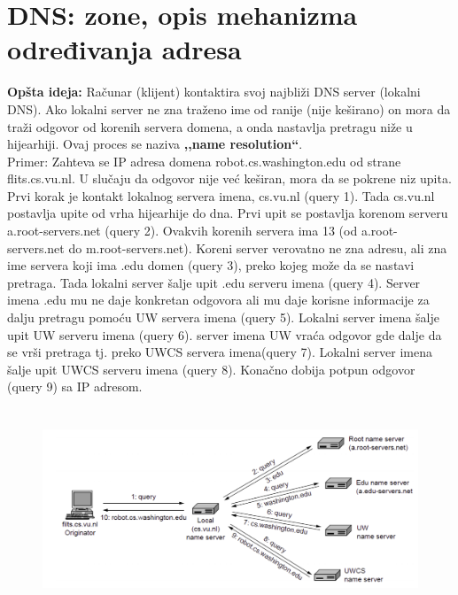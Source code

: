 \documentclass[a4paper]{article}
\begin{document}
\section{DNS: zone, opis mehanizma određivanja adresa}
    \textbf{Opšta ideja:} Računar (klijent) kontaktira svoj najbliži DNS server (lokalni DNS).
    Ako lokalni server ne zna traženo ime od ranije (nije keširano) on mora da traži odgovor od korenih
    servera domena, a onda nastavlja pretragu niže u hijearhiji. Ovaj proces se naziva 
    \textbf{,,name resolution``}.\\
    \indent Primer: Zahteva se IP adresa domena robot.cs.washington.edu od strane flits.cs.vu.nl.
    U slučaju da odgovor nije već keširan, mora da se pokrene niz upita. Prvi korak je kontakt
    lokalnog servera imena, cs.vu.nl (query 1). Tada cs.vu.nl postavlja upite od vrha hijearhije do dna. 
    Prvi upit se postavlja korenom serveru a.root-servers.net (query 2). Ovakvih korenih servera
    ima 13 (od a.root-servers.net do m.root-servers.net). 
    Koreni server verovatno ne zna adresu, ali zna ime servera koji ima .edu domen (query 3),
    preko kojeg može da se nastavi pretraga. Tada lokalni server šalje upit .edu serveru imena (query 4).
    Server imena .edu mu ne daje konkretan odgovora ali mu daje korisne informacije za dalju
    pretragu pomoću UW servera imena (query 5). Lokalni server imena šalje upit UW serveru imena (query 6).
    server imena UW vraća odgovor gde dalje da se vrši pretraga tj. preko UWCS servera imena(query 7).
    Lokalni server imena šalje upit UWCS serveru imena (query 8). Konačno dobija potpun odgovor (query 9)
    sa IP adresom. 
    \begin{figure}[H]
        \begin{center}
            \includegraphics[width=120mm,height=60mm]{Slike/dns4.png}
        \end{center}
    \end{figure}
\end{document}
